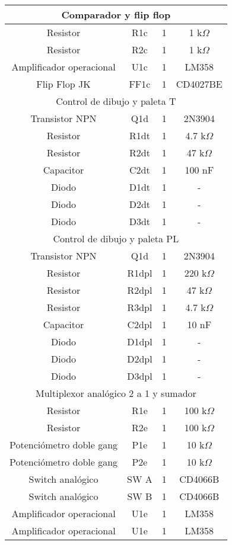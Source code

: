 \begin{longtable}{cccc}
\midrule
\multicolumn{4}{c}{Comparador y flip flop} \\ 
\midrule
Resistor & R1c & 1 & 1 k$\Omega$ \\ 
Resistor & R2c & 1 & 1 k$\Omega$ \\ 
Amplificador operacional & U1c & 1 & LM358 \\  
Flip Flop JK & FF1c & 1 & CD4027BE \\  

\midrule
\multicolumn{4}{c}{Control de dibujo y paleta T} \\ 
\midrule
Transistor NPN & Q1d & 1 & 2N3904 \\  
Resistor & R1dt & 1 & 4.7 k$\Omega$ \\  
Resistor & R2dt & 1 & 47 k$\Omega$ \\ 
Capacitor & C2dt & 1 & 100 nF \\ 
Diodo & D1dt & 1 & - \\ 
Diodo & D2dt & 1 & - \\  
Diodo & D3dt & 1 & - \\  

\midrule
\multicolumn{4}{c}{Control de dibujo y paleta PL} \\ 
\midrule
Transistor NPN & Q1d & 1 & 2N3904 \\  
Resistor & R1dpl & 1 & 220 k$\Omega$ \\  
Resistor & R2dpl & 1 & 47 k$\Omega$ \\ 
Resistor & R3dpl & 1 & 4.7 k$\Omega$ \\ 
Capacitor & C2dpl & 1 & 10 nF \\ 
Diodo & D1dpl & 1 & - \\ 
Diodo & D2dpl & 1 & - \\  
Diodo & D3dpl & 1 & - \\  

\midrule
\multicolumn{4}{c}{Multiplexor anal\'ogico 2 a 1 y sumador} \\ 
\midrule
Resistor & R1e & 1 & 100 k$\Omega$ \\  
Resistor & R2e & 1 & 100 k$\Omega$ \\  
Potenci\'ometro doble gang & P1e & 1 & 10 k$\Omega$ \\
Potenci\'ometro doble gang & P2e & 1 & 10 k$\Omega$ \\
Switch anal\'ogico & SW A & 1 & CD4066B \\
Switch anal\'ogico & SW B & 1 & CD4066B \\
Amplificador operacional & U1e & 1 & LM358 \\ 
Amplificador operacional & U1e & 1 & LM358 \\ 


\end{longtable}
